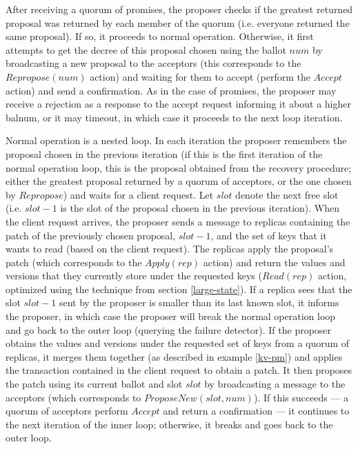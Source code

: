 \documentclass[12pt,a4paper,en]{pracamgr}
\begin{document}
After receiving a quorum of promises, the proposer checks if the greatest returned proposal was returned by each member of the quorum (i.e. everyone returned the same proposal). If so, it proceeds to normal operation. Otherwise, it first attempts to get the decree of this proposal chosen using the ballot $num$ by broadcasting a new proposal to the acceptors (this corresponds to the $Repropose(num)$ action) and waiting for them to accept (perform the $Accept$ action) and send a confirmation. As in the case of promises, the proposer may receive a rejection as a response to the accept request informing it about a higher balnum, or it may timeout, in which case it proceeds to the next loop iteration.

Normal operation is a nested loop. In each iteration the proposer remembers the proposal chosen in the previous iteration (if this is the first iteration of the normal operation loop, this is the proposal obtained from the recovery procedure; either the greatest proposal returned by a quorum of acceptors, or the one chosen by $Repropose$) and waits for a client request. Let $slot$ denote the next free slot (i.e. $slot - 1$ is the slot of the proposal chosen in the previous iteration). When the client request arrives, the proposer sends a message to replicas containing the patch of the previously chosen proposal, $slot - 1$, and the set of keys that it wants to read (based on the client request). The replicas apply the proposal's patch (which corresponds to the $Apply(rep)$ action) and return the values and versions that they currently store under the requested keys ($Read(rep)$ action, optimized using the technique from section \ref{large-state}). If a replica sees that the slot $slot - 1$ sent by the proposer is smaller than its last known slot, it informs the proposer, in which case the proposer will break the normal operation loop and go back to the outer loop (querying the failure detector). If the proposer obtains the values and versions under the requested set of keys from a quorum of replicas, it merges them together (as described in example \ref{kv-pm}) and applies the transaction contained in the client request to obtain a patch. It then proposes the patch using its current ballot and slot $slot$ by broadcasting a message to the acceptors (which corresponds to $ProposeNew(slot, num)$). If this succeeds --- a quorum of acceptors perform $Accept$ and return a confirmation --- it continues to the next iteration of the inner loop; otherwise, it breaks and goes back to the outer loop.
\end{document}
